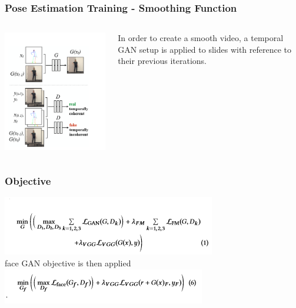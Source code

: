 \documentclass{beamer}
\begin{document}
        \begin{frame}
        \frametitle{Pose Estimation Training - Smoothing Function}
            \begin{columns}
            \begin{column}{0.5\textwidth}
                \includegraphics[scale=.5]{images/training2.png}
            \end{column}
            \begin{column}{0.5\textwidth}
                In order to create a smooth video, a temporal GAN setup is applied to slides with reference to their previous iterations.
                \vspace{0.2in}
                \begin{center}
                \end{center}
            \end{column}
        \end{columns}
    \end{frame}

\begin{frame}
        \frametitle{Objective}
        \includegraphics[scale=.6]{images/objective.png}\\
        \vspace{0.4in}
        face GAN objective is then applied\\
        \vspace{0.4in}
        \includegraphics[scale=.6]{images/faceGan.png}
    \end{frame}
\end{document}
